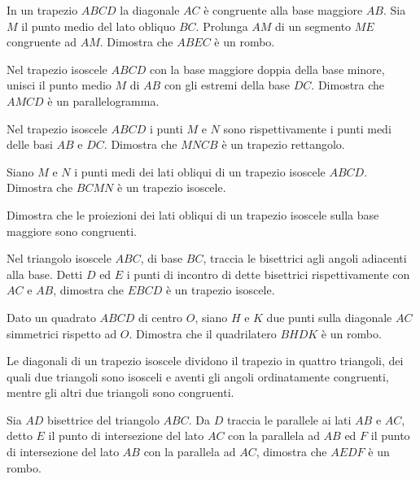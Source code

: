 \begin{multicols}{2}
\begin{esercizio}
\label{ese:4.27}
In un trapezio $ABCD$ la diagonale $AC$ è congruente alla base 
maggiore $AB$. Sia $M$ il punto medio del lato obliquo $BC$. Prolunga 
$AM$ di un segmento $ME$ congruente ad $AM$. Dimostra che $ABEC$ è un 
rombo.
\end{esercizio}

\begin{esercizio}
\label{ese:4.28}
Nel trapezio isoscele $ABCD$ con la base maggiore doppia della base 
minore, unisci il punto medio $M$ di $AB$ con gli estremi della base 
$DC$. Dimostra che $AMCD$ è un parallelogramma.
\end{esercizio}

\begin{esercizio}
\label{ese:4.29}
Nel trapezio isoscele $ABCD$ i punti $M$ e $N$ sono rispettivamente i 
punti medi delle basi $AB$ e $DC$. Dimostra che $MNCB$ è un trapezio 
rettangolo.
\end{esercizio}

\begin{esercizio}
\label{ese:4.30}
Siano $M$ e $N$ i punti medi dei lati obliqui di un trapezio isoscele 
$ABCD$. Dimostra che $BCMN$ è un trapezio isoscele.
\end{esercizio}

\begin{esercizio}
\label{ese:4.32}
Dimostra che le proiezioni dei lati obliqui di un trapezio isoscele 
sulla base maggiore sono congruenti.
\end{esercizio}

\begin{esercizio}
\label{ese:4.33}
Nel triangolo isoscele $ABC$, di base $BC$, traccia le bisettrici 
agli angoli adiacenti alla base. Detti $D$ ed $E$ i punti di incontro 
di dette bisettrici rispettivamente con $AC$ e $AB$, dimostra che 
$EBCD$ è un trapezio isoscele.
\end{esercizio}

\begin{esercizio}
\label{ese:4.41}
Dato un quadrato $ABCD$ di centro $O$, siano $H$ e $K$ due punti 
sulla diagonale $AC$ simmetrici rispetto ad $O$. Dimostra che il 
quadrilatero $BHDK$ è un rombo. 
\end{esercizio}

\begin{esercizio}
\label{ese:4.48}
Le diagonali di un trapezio isoscele dividono il trapezio in quattro 
triangoli, dei quali due triangoli sono isosceli e aventi gli angoli 
ordinatamente congruenti, mentre gli altri due triangoli sono 
congruenti.
\end{esercizio}

\begin{esercizio}
\label{ese:4.59}
Sia $AD$ bisettrice del triangolo $ABC$. Da $D$ traccia le parallele 
ai lati $AB$ e $AC$, detto $E$ il punto di intersezione del lato $AC$ 
con la parallela ad $AB$ ed $F$ il punto di intersezione del lato 
$AB$ con la parallela ad $AC$, dimostra che $AEDF$ è un rombo.
\end{esercizio}

\end{multicols}

